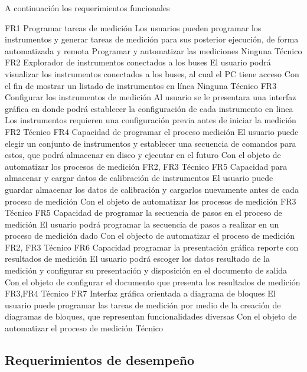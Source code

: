 \documentclass[paper=a4,oneside,fontsize=12pt]{scrartcl}
\begin{document}
	A continuación los requerimientos funcionales
		
		{FR1}
			{Programar tareas de medición}
			{Los usuarios pueden programar los instrumentos y generar tareas de medición para sus posterior ejecución, de forma automatizada y remota}
			{Programar y automatizar las mediciones}
			{Ninguna}
			{Técnico}
		{FR2}
			{Explorador de instrumentos conectados a los buses}
			{El usuario podrá visualizar los instrumentos conectados a los buses, al cual el PC tiene acceso}
			{Con el fin de mostrar un listado de instrumentos en línea}
			{Ninguna}
			{Técnico}
		{FR3}
			{Configurar los instrumentos de medición}
			{Al usuario se le presentara una interfaz gráfica en donde podrá establecer la configuración de cada instrumento en linea}
			{Los instrumentos requieren una configuración previa antes de iniciar la medición}
			{FR2}
			{Técnico}
		{FR4}
			{Capacidad de programar el proceso medición}
			{El usuario puede elegir un conjunto de instrumentos y establecer una secuencia de comandos para estos, que podrá almacenar en disco y ejecutar en el futuro}
			{Con el objeto de automatizar los procesos de medición}
			{FR2, FR3}
			{Técnico}			
		{FR5}
			{Capacidad para almacenar y cargar datos de calibración de instrumentos}
			{El usuario puede guardar almacenar los datos de calibración y cargarlos nuevamente antes de cada proceso de medición}
			{Con el objeto de automatizar los procesos de medición}
			{FR3}
			{Técnico}
		{FR5}
			{Capacidad de programar la secuencia de pasos en el proceso de medición}
			{El usuario podrá programar la secuencia de pasos a realizar en un proceso de medición dado}
			{Con el objecto de automatizar el proceso de medición}
			{FR2, FR3}	
			{Técnico}		
		{FR6}
			{Capacidad programar la presentación gráfica reporte con resultados de medición}
			{El usuario podrá escoger los datos resultado de la medición y configurar su presentación y disposición en el documento de salida}
			{Con el objeto de configurar el documento que presenta los resultados de medición}
			{FR3,FR4}
			{Técnico}
		{FR7}
			{Interfaz gráfica orientada a diagrama de bloques}
			{El usuario puede programar las tareas de medición por medio de la creación de diagramas de bloques, que representan funcionalidades diversas}
			{Con el objeto de automatizar el proceso de medición}	
			{}		
			{Técnico}			
			
	\subsection{Requerimientos de desempeño}	
			
\end{document}
